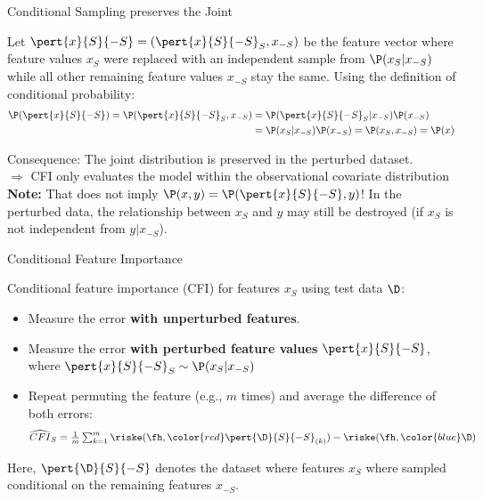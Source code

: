 \documentclass[11pt,compress,t,notes=noshow, aspectratio=169, xcolor=table]{beamer}
\begin{document}
 
 \begin{frame}{Conditional Sampling preserves the Joint}
 
 Let $\pert{x}{S}{-S} = (\pert{x}{S}{-S}_S, x_{-S})$ be the feature vector where feature values $x_S$ were replaced with an independent sample from $\P(x_S|x_{-S})$ while all other remaining feature values $x_{-S}$ stay the same. %
 Using the definition of conditional probability:
%
\begin{align*}
  \P(\pert{x}{S}{-S}) = \P(\pert{x}{S}{-S}_S, x_{-S}) &= \P(\pert{x}{S}{-S}_S|x_{-S}) \P(x_{-S})\\
   &= \P(x_S|x_{-S}) \P(x_{-S}) =  \P(x_S, x_{-S})= \P(x)
\end{align*}
\pause

Consequence: The joint distribution is preserved in the perturbed dataset.\\
$\Rightarrow$ CFI only evaluates the model within the observational covariate distribution\\
 \lz
 \textbf{Note:} That does not imply $\P(x,y) = \P(\pert{x}{S}{-S}, y)$! In the perturbed data, the relationship between $x_S$ and $y$ may still be destroyed (if $x_S$ is not independent from $y | x_{-S}$).\\
 \end{frame}



\begin{frame}{Conditional Feature Importance  }
\normalsize

Conditional feature importance (CFI) for features $x_S$ using test data $\D$:
\begin{itemize}
  \item Measure the error \color{blue}\textbf{with unperturbed features}\color{black}.
  \item Measure the error \color{red}\textbf{with perturbed feature values} \color{black} $\pert{x}{S}{-S}$, where $\pert{x}{S}{-S}_S \sim \P(x_S|x_{-S})$
  \item Repeat permuting the feature (e.g., $m$ times) and average the difference of both errors: 
$$\widehat{CFI}_S = \tfrac{1}{m} \textstyle\sum\nolimits_{k = 1}^{m} \riske (\fh, {\color{red}\pert{\D}{S}{-S}_{(k)}}) - \riske (\fh, {\color{blue}\D})$$
\end{itemize}

Here, $\pert{\D}{S}{-S}$ denotes the dataset where features $x_S$ where sampled conditional on the remaining features $x_{-S}$.


\end{frame}
\end{document}
